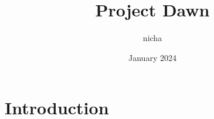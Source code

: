 \documentclass{article}
\title{Project Dawn}
\author{nicha }
\date{January 2024}
\begin{document}
\maketitle

\section{Introduction}
\end{document}
